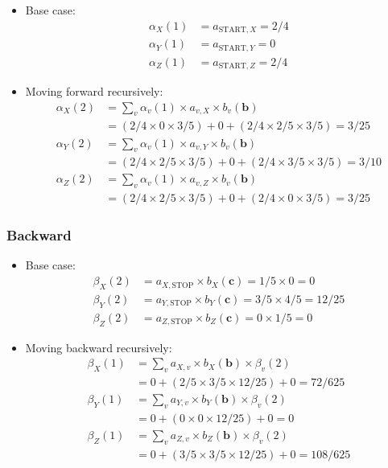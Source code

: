 \documentclass[11pt,fancychapters]{article}
\begin{document}
\begin{itemize}
	\item Base case:
	\begin{align*}
		\alpha_X(1) &= a_{\text{START}, X} = 2/4 \\
		\alpha_Y(1) &= a_{\text{START}, Y} = 0 \\
		\alpha_Z(1) &= a_{\text{START}, Z} = 2/4
	\end{align*}
	
	\item Moving forward recursively:
	\begin{align*}
		\alpha_X(2) &= \sum_v \alpha_v(1) \times a_{v, X} \times b_v(\textbf{b}) \\
		&= (2/4 \times 0 \times 3/5) + 0 + (2/4 \times 2/5 \times 3/5) = 3/25 \\
		\alpha_Y(2) &= \sum_v \alpha_v(1) \times a_{v, Y} \times b_v(\textbf{b}) \\
		& = (2/4 \times 2/5 \times 3/5) + 0 + (2/4 \times 3/5 \times 3/5) = 3/10 \\
		\alpha_Z(2) &= \sum_v \alpha_v(1) \times a_{v, Z} \times b_v(\textbf{b}) \\
		& = (2/4 \times 2/5 \times 3/5) + 0 + (2/4 \times 0 \times 3/5) = 3/25
	\end{align*}
\end{itemize}

\subsubsection*{Backward}

\begin{itemize}
	\item Base case:
	\begin{align*}
		\beta_X(2) &= a_{X, \text{STOP}} \times b_X(\textbf{c}) = 1/5 \times 0 = 0 \\
		\beta_Y(2) &= a_{Y, \text{STOP}} \times b_Y(\textbf{c}) = 3/5 \times 4/5 = 12/25 \\
		\beta_Z(2) &= a_{Z, \text{STOP}} \times b_Z(\textbf{c}) = 0 \times 1/5 = 0
	\end{align*}
	
	\item Moving backward recursively:
	\begin{align*}
		\beta_X(1) &= \sum_v a_{X, v} \times b_X(\textbf{b}) \times \beta_v(2) \\
		&= 0 + (2/5 \times 3/5 \times 12/25) + 0 = 72/625 \\
		\beta_Y(1) &= \sum_v a_{Y, v} \times b_Y(\textbf{b}) \times \beta_v(2) \\
		&= 0 + (0 \times 0 \times 12/25) + 0 = 0 \\
		\beta_Z(1) &= \sum_v a_{Z, v} \times b_Z(\textbf{b}) \times \beta_v(2) \\
		&= 0 + (3/5 \times 3/5 \times 12/25) + 0 = 108/625
	\end{align*}
\end{itemize}
\end{document}
